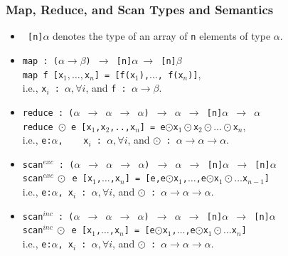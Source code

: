 \documentclass{beamer}
\renewcommand{\emph}[1]{\textcolor{structure}{#1}}
\newcommand{\emp}[1]{\textcolor{DikuRed}{ #1}}
\begin{document}
\begin{frame}[fragile,t]
  \frametitle{Map, Reduce, and Scan Types and Semantics}

\begin{itemize}
    \item {\tt \emp{[n]$\alpha$}} denotes the type of an array of \emp{\tt n} elements of type \emp{$\alpha$}.\smallskip
    \item \emp{\tt map~:~($\alpha\rightarrow\beta$)~$\rightarrow$~[n]$\alpha~\rightarrow$~[n]$\beta$}\\
    \emph{\tt map f [x$_1,\ldots, $x$_n$] = [f(x$_1$),$\ldots$, f(x$_n$)]},\\  
        i.e., \emp{\tt{}x$_i$~:~$\alpha, \forall i$}, and 
        \emp{\tt f~:~$\alpha\rightarrow\beta$}.\medskip

    \item \emp{{\tt reduce~:~($\alpha$~$\rightarrow$~$\alpha$~$\rightarrow$~$\alpha$)~$\rightarrow$~$\alpha$~$\rightarrow$~[n]$\alpha$~$\rightarrow$~$\alpha$}}\\
        \emph{\tt reduce $\odot$~e~[x$_1$,x$_2$,..,x$_n$]~=~e$\odot$x$_1\odot$x$_2\odot\ldots\odot$x$_n$},\\
        i.e., \emp{{\tt{}e:$\alpha$, ~~ x$_i$~:~$\alpha, \forall i$}}, and 
        \emp{\tt $\odot$~:~$\alpha\rightarrow\alpha\rightarrow\alpha$}.\medskip

    \item \emp{{\tt scan$^{exc}$~:~($\alpha$~$\rightarrow$~$\alpha$~$\rightarrow$~$\alpha$)~$\rightarrow$~$\alpha$~$\rightarrow$~[n]$\alpha$~$\rightarrow$~[n]$\alpha$}}\\
        \emph{\tt scan$^{exc}~\odot$~e~[x$_1$,$\ldots$,x$_n$]~=~[e,e$\odot$x$_1$,$\ldots$,e$\odot$x$_1\odot\ldots$x$_{n-1}$]}\\
        i.e., \emp{{\tt{}e:$\alpha$, x$_i$~:~$\alpha, \forall i$}}, and 
        \emp{\tt $\odot$~:~$\alpha\rightarrow\alpha\rightarrow\alpha$}.\medskip

    \item \emp{{\tt scan$^{inc}$~:~($\alpha$~$\rightarrow$~$\alpha$~$\rightarrow$~$\alpha$)~$\rightarrow$~$\alpha$~$\rightarrow$~[n]$\alpha$~$\rightarrow$~[n]$\alpha$}}\\
        \emph{\tt scan$^{inc}~\odot$~e~[x$_1$,$\ldots$,x$_n$]~=~[e$\odot$x$_1$,$\ldots$,e$\odot$x$_1\odot\ldots$x$_{n}$]}\\
        i.e., \emp{{\tt{}e:$\alpha$, x$_i$~:~$\alpha, \forall i$}}, and 
        \emp{\tt $\odot$~:~$\alpha\rightarrow\alpha\rightarrow\alpha$}.

\end{itemize}

\end{frame}
\end{document}
